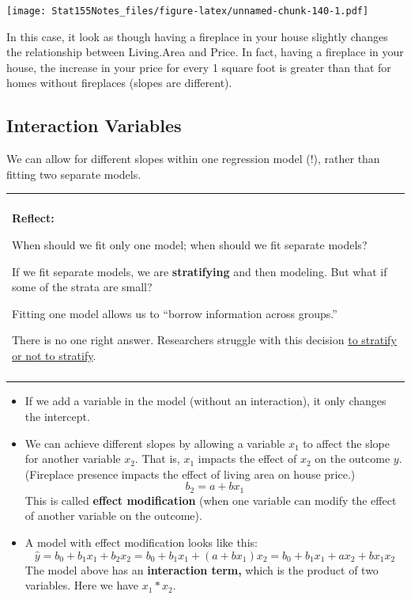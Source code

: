 \documentclass[]{book}
\newenvironment{reflect}
{
    \begin{center}
    
    \begin{tabular}{|p{0.8\textwidth}|}
    \rowcolor{LightBlue}
    \hline\\
    \rowcolor{LightBlue}
    \textbf{Reflect:}
}
{
    \\\rowcolor{LightBlue}
    \\\hline
    \end{tabular} 
    \end{center}
}
\begin{document}
\texttt{[image: Stat155Notes\_files/figure-latex/unnamed-chunk-140-1.pdf]}

In this case, it look as though having a fireplace in your house slightly changes the relationship between Living.Area and Price. In fact, having a fireplace in your house, the increase in your price for every 1 square foot is greater than that for homes without fireplaces (slopes are different).

\hypertarget{interaction-variables}{%
\subsection{Interaction Variables}\label{interaction-variables}}

We can allow for different slopes within one regression model (!), rather than fitting two separate models.

\begin{reflect}
When should we fit only one model; when should we fit separate models?

If we fit separate models, we are \textbf{stratifying} and then
modeling. But what if some of the strata are small?

Fitting one model allows us to ``borrow information across groups.''

There is no one right answer. Researchers struggle with this decision
\href{https://www.ncbi.nlm.nih.gov/pubmed/22125224}{to stratify or not
to stratify}.
\end{reflect}

\begin{itemize}
\item
  If we add a variable in the model (without an interaction), it only changes the intercept.
\item
  We can achieve different slopes by allowing a variable \(x_1\) to affect the slope for another variable \(x_2\). That is, \(x_1\) impacts the effect of \(x_2\) on the outcome \(y\). (Fireplace presence impacts the effect of living area on house price.)
  \[b_2 = a + bx_1\]
  This is called \textbf{effect modification} (when one variable can modify the effect of another variable on the outcome).
\item
  A model with effect modification looks like this:
  \[\hat{y} = b_0 + b_1x_{1} + b_2x_{2}= b_0 + b_1x_{1} + (a+bx_1)x_{2}= b_0 + b_1x_{1} +ax_2+bx_1x_{2}\]
  The model above has an \textbf{interaction term,} which is the product of two variables. Here we have \(x_1*x_2\).
\end{itemize}
\end{document}
